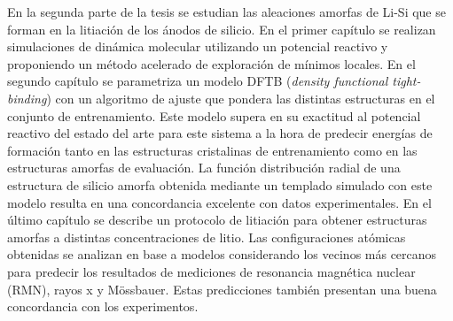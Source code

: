 En la segunda parte de la tesis se estudian las aleaciones amorfas de Li-Si que 
se forman en la litiación de los ánodos de silicio. En el primer capítulo se 
realizan simulaciones de dinámica molecular utilizando un potencial reactivo y 
proponiendo un método acelerado de exploración de mínimos locales. En el segundo 
capítulo se parametriza un modelo DFTB (\textit{density functional tight-binding})
con un algoritmo de ajuste que pondera las distintas estructuras en el conjunto 
de entrenamiento. Este modelo supera en su exactitud al potencial reactivo del 
estado del arte para este sistema a la hora de predecir energías de formación 
tanto en las estructuras cristalinas de entrenamiento como en las estructuras 
amorfas de evaluación. La función distribución radial de una estructura de 
silicio amorfa obtenida mediante un templado simulado con este modelo resulta en 
una concordancia excelente con datos experimentales. En el último capítulo se 
describe un protocolo de litiación para obtener estructuras amorfas a distintas 
concentraciones de litio. Las configuraciones atómicas obtenidas se analizan en base a 
modelos considerando los vecinos más cercanos para predecir los resultados de mediciones de resonancia magnética nuclear (RMN), 
rayos x y Mössbauer. Estas predicciones también presentan una buena concordancia 
con los experimentos.
